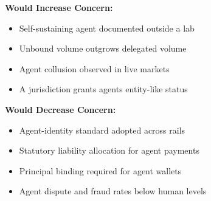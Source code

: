 \documentclass[11pt,letterpaper]{article}
\begin{document}
\begin{minipage}[t]{0.48\textwidth}
\textbf{Would Increase Concern:}
\begin{itemize}[nosep]
  \item Self-sustaining agent documented outside a lab
  \item Unbound volume outgrows delegated volume
  \item Agent collusion observed in live markets
  \item A jurisdiction grants agents entity-like status
\end{itemize}
\end{minipage}
\hfill
\begin{minipage}[t]{0.48\textwidth}
\textbf{Would Decrease Concern:}
\begin{itemize}[nosep]
  \item Agent-identity standard adopted across rails
  \item Statutory liability allocation for agent payments
  \item Principal binding required for agent wallets
  \item Agent dispute and fraud rates below human levels
\end{itemize}
\end{minipage}

\endgroup
\end{document}
